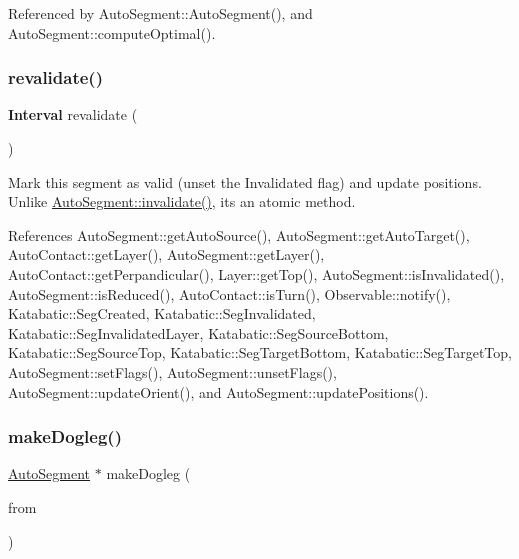 Referenced by Auto\+Segment\+::\+Auto\+Segment(), and Auto\+Segment\+::compute\+Optimal().

\mbox{\label{classKatabatic_1_1AutoSegment_a88ac40c065bce0ff97792d18b41b6a67}} 
\subsubsection{\texorpdfstring{revalidate()}{revalidate()}}
{\footnotesize\ttfamily \textbf{ Interval} revalidate (\begin{DoxyParamCaption}{ }\end{DoxyParamCaption})}

Mark this segment as valid (unset the Invalidated flag) and update positions. Unlike \mbox{\hyperlink{classKatabatic_1_1AutoSegment_a23599eee5a07af377fbc8d47cda7e7b0}{Auto\+Segment\+::invalidate()}}, it\textquotesingle{}s an atomic method. 

References Auto\+Segment\+::get\+Auto\+Source(), Auto\+Segment\+::get\+Auto\+Target(), Auto\+Contact\+::get\+Layer(), Auto\+Segment\+::get\+Layer(), Auto\+Contact\+::get\+Perpandicular(), Layer\+::get\+Top(), Auto\+Segment\+::is\+Invalidated(), Auto\+Segment\+::is\+Reduced(), Auto\+Contact\+::is\+Turn(), Observable\+::notify(), Katabatic\+::\+Seg\+Created, Katabatic\+::\+Seg\+Invalidated, Katabatic\+::\+Seg\+Invalidated\+Layer, Katabatic\+::\+Seg\+Source\+Bottom, Katabatic\+::\+Seg\+Source\+Top, Katabatic\+::\+Seg\+Target\+Bottom, Katabatic\+::\+Seg\+Target\+Top, Auto\+Segment\+::set\+Flags(), Auto\+Segment\+::unset\+Flags(), Auto\+Segment\+::update\+Orient(), and Auto\+Segment\+::update\+Positions().

\mbox{\label{classKatabatic_1_1AutoSegment_a39c927c04b5016770692b9b8448c2f04}} 
\subsubsection{\texorpdfstring{make\+Dogleg()}{makeDogleg()}\hspace{0.1cm}{\footnotesize\ttfamily [1/3]}}
{\footnotesize\ttfamily \mbox{\hyperlink{classKatabatic_1_1AutoSegment}{Auto\+Segment}} $\ast$ make\+Dogleg (\begin{DoxyParamCaption}\item[{\mbox{\hyperlink{classKatabatic_1_1AutoContact}{Auto\+Contact}} $\ast$}]{from }\end{DoxyParamCaption})}


